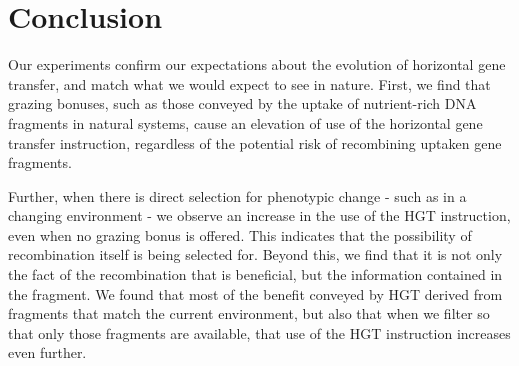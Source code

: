 \documentclass[PhD]{msu-thesis}
\begin{document}

\section{Conclusion}
Our experiments confirm our expectations about the evolution of horizontal gene transfer, and match what we would expect to see in nature. First, we find that grazing bonuses, such as those conveyed by the uptake of nutrient-rich DNA fragments in natural systems, cause an elevation of use of the horizontal gene transfer instruction, regardless of the potential risk of recombining uptaken gene fragments. 

Further, when there is direct selection for phenotypic change - such as in a changing environment - we observe an increase in the use of the HGT instruction, even when no grazing bonus is offered. This indicates that the possibility of recombination itself is being selected for. Beyond this, we find that it is not only the fact of the recombination that is beneficial, but the information contained in the fragment. We found that 
most of the benefit conveyed by HGT derived from fragments that match the current environment, but also that when we filter so that only those fragments are available, that use of the HGT instruction increases even further. 
\end{document}
